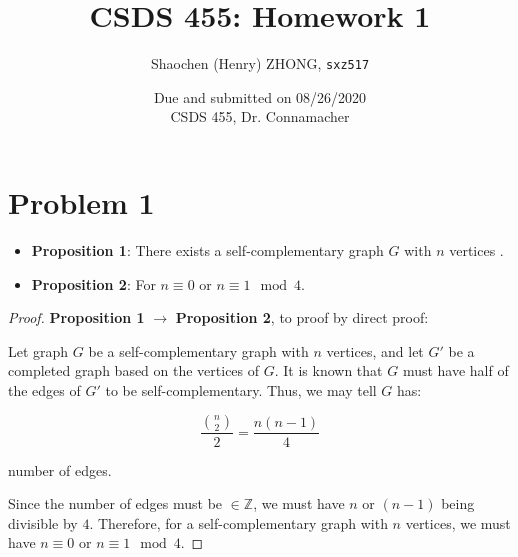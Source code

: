\documentclass[12pt]{article}
\newcommand{\ilc}{\texttt}
\begin{document}
\title{\textbf{CSDS 455: Homework 1}}

\author{Shaochen (Henry) ZHONG, \ilc{sxz517}}
\date{Due and submitted on 08/26/2020 \\ CSDS 455, Dr. Connamacher}
\maketitle

\section{Problem 1}

\begin{itemize}
    \item \textbf{Proposition 1}: There exists a self-complementary graph $G$ with $n$ vertices .
    \item \textbf{Proposition 2}: For $n \equiv 0$ or $n \equiv 1 \mod 4$.
\end{itemize}

\begin{proof}
\textbf{Proposition 1} $\longrightarrow$ \textbf{Proposition 2}, to proof by direct proof:\newline

Let graph $G$ be a self-complementary graph with $n$ vertices, and let $G'$ be a completed graph based on the vertices of $G$. It is known that $G$ must have half of the edges of $G'$ to be self-complementary. Thus, we may tell $G$ has:

\begin{equation}
    \frac{{n \choose 2}}{2} = \frac{n(n-1)}{4} \nonumber
\end{equation}

number of edges.

Since the number of edges must be $\in \mathbb{Z}$, we must have $n$ or $(n-1)$ being divisible by $4$. Therefore, for a self-complementary graph with $n$ vertices, we must have $n \equiv 0$ or $n \equiv 1 \mod 4$.
\end{proof}
\end{document}

